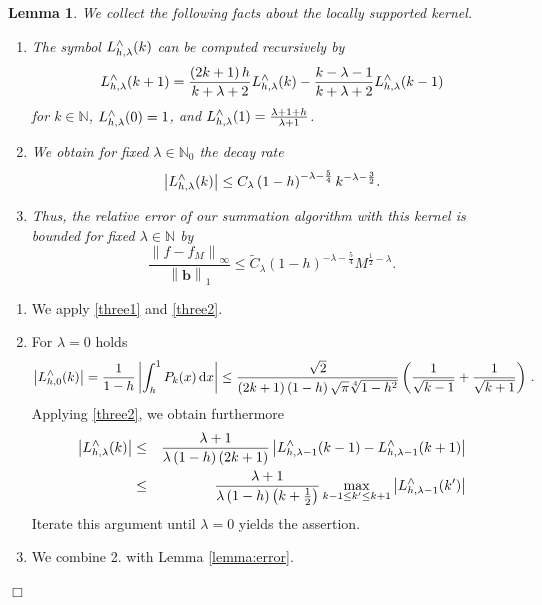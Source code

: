 \documentclass[11pt,a4paper,twoside,bibtotoc]{scrartcl}
\theoremstyle{plain}
\newtheorem{lemma}[theorem]{Lemma}
\theoremstyle{definition}
\theoremstyle{remark}
\newenvironment{proof}{{\bf Proof.}}{$\Box$}
\newcommand{\N}{\ensuremath{\mathbb{N}}}
\newcommand{\NZ}{\ensuremath{\mathbb{N}_{0}}}
\newcommand{\fun}[2]{\ensuremath{#1{\hspace{-0.4ex}}\left(#2\right)}}
\newcommand{\paren}[1]{\ensuremath{\left(#1\right)}}
\newcommand{\mb}[1]{\mathbf{#1}}
\newcommand{\V}[1]{\mb{#1}}
\newcommand{\dx}{\text{\rm{d}}}
\numberwithin{equation}{section}
\numberwithin{table}{section}
\numberwithin{figure}{section}
\begin{document}
\begin{lemma}
  We collect the following facts about the locally supported kernel.
  \begin{enumerate}
  \item The symbol $\fun{L_{h,\lambda}^{\wedge}}{k}$ can be computed recursively by
    \[
    \fun{L_{h,\lambda}^{\wedge}}{k+1} = \frac{\paren{2k+1} h}{k+\lambda+2}
    \fun{L_{h,\lambda}^{\wedge}}{k}   - \frac{k-\lambda-1}{k+\lambda+2}
    \fun{L_{h,\lambda}^{\wedge}}{k-1}
    \]
    for $k\in \N$, $\fun{L_{h,\lambda}^{\wedge}}{0} = 1$, and
    $\fun{L_{h,\lambda}^{\wedge}}{1} = \frac{\lambda + 1 + h}{\lambda+1}$.
  \item We obtain for fixed $\lambda \in \NZ$ the decay rate
    \[
    \left|\fun{L_{h,\lambda}^{\wedge}}{k}\right| \le C_{\lambda}
    \left(1-h\right)^{-\lambda-\frac{5}{4}} k^{-\lambda-\frac{3}{2}}.
    \]
  \item Thus, the relative error of our summation algorithm with this kernel
  is bounded for fixed $\lambda \in \N$ by
  \begin{equation}
    \label{error:Lh}
    \frac{\left\|f - f_{M}\right\|_{\infty}}{\left\|\V{b}\right\|_1} \le
    \tilde C_{\lambda} \left(1-h\right)^{-\lambda-\frac{5}{4}} M^{\frac{1}{2}-\lambda}.
  \end{equation}
  \end{enumerate}
\end{lemma}
\begin{proof}
  \begin{enumerate}
  \item We apply \eqref{three1} and \eqref{three2}.
  \item For $\lambda=0$ holds
    \[
    \left|\fun{L_{h,0}^{\wedge}}{k}\right| = \frac{1}{1-h}
    \left|\int_{h}^{1} \fun{P_{k}}{x} \dx x\right| \le
    \frac{\sqrt{2}}{\left(2k+1\right)\left(1-h\right)\sqrt{\pi}\sqrt[4]{1-h^2}}
    \left(\frac{1}{\sqrt{k-1}}+\frac{1}{\sqrt{k+1}}\right)\,.
    \]
    Applying \eqref{three2}, we obtain furthermore
    \begin{eqnarray*}
      \left|\fun{L_{h,\lambda}^{\wedge}}{k}\right| &\le&
      \frac{\lambda+1}{\lambda\left(1-h\right)\left(2k+1\right)}
      \left|\fun{L_{h,\lambda-1}^{\wedge}}{k-1}-
        \fun{L_{h,\lambda-1}^{\wedge}}{k+1}\right|\\ &\le&
      \frac{\lambda+1}{\lambda\left(1-h\right)\left(k+\frac{1}{2}\right)}
      \max\limits_{k-1\le k'\le k+1}
      \left|\fun{L_{h,\lambda-1}^{\wedge}}{k'}\right|
    \end{eqnarray*}
    Iterate this argument until $\lambda=0$ yields the assertion.
  \item We combine 2. with Lemma \ref{lemma:error}. 
  \end{enumerate}
\end{proof}
\end{document}
